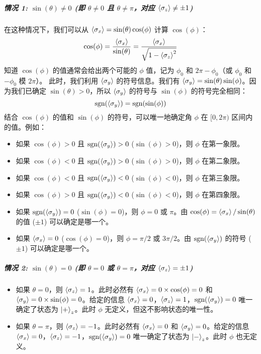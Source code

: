 \documentclass[12pt, a4paper]{article}
\begin{document}
\subparagraph{情况 1: \(\sin(\theta) \neq 0\) (即 \(\theta \neq 0\) 且 \(\theta \neq \pi\)，对应 \(\expval{\sigma_z} \neq \pm 1\))}
在这种情况下，我们可以从 \(\expval{\sigma_x} = \sin(\theta) \cos(\phi)\) 计算 \(\cos(\phi)\)：
\[
\cos(\phi) = \frac{\expval{\sigma_x}}{\sin(\theta)} = \frac{\expval{\sigma_x}}{\sqrt{1 - \expval{\sigma_z}^2}}
\]
知道 \(\cos(\phi)\) 的值通常会给出两个可能的 \(\phi\) 值，记为 \(\phi_0\) 和 \(2\pi - \phi_0\)（或 \(\phi_0\) 和 \(-\phi_0\) 模 \(2\pi\)）。
此时，我们利用 \(\expval{\sigma_y}\) 的符号信息。我们有 \(\expval{\sigma_y} = \sin(\theta) \sin(\phi)\)。因为我们已确定 \(\sin(\theta) > 0\)，所以 \(\expval{\sigma_y}\) 的符号与 \(\sin(\phi)\) 的符号完全相同：
\[
\text{sgn}(\expval{\sigma_y}) = \text{sgn}(\sin(\phi))
\]
结合 \(\cos(\phi)\) 的值和 \(\sin(\phi)\) 的符号，可以唯一地确定角 \(\phi\) 在 \([0, 2\pi)\) 区间内的值。例如：
\begin{itemize}
    \item 如果 \(\cos(\phi) > 0\) 且 \(\text{sgn}(\expval{\sigma_y}) > 0\) (\(\sin(\phi) > 0\))，则 \(\phi\) 在第一象限。
    \item 如果 \(\cos(\phi) < 0\) 且 \(\text{sgn}(\expval{\sigma_y}) > 0\) (\(\sin(\phi) > 0\))，则 \(\phi\) 在第二象限。
    \item 如果 \(\cos(\phi) < 0\) 且 \(\text{sgn}(\expval{\sigma_y}) < 0\) (\(\sin(\phi) < 0\))，则 \(\phi\) 在第三象限。
    \item 如果 \(\cos(\phi) > 0\) 且 \(\text{sgn}(\expval{\sigma_y}) < 0\) (\(\sin(\phi) < 0\))，则 \(\phi\) 在第四象限。
    \item 如果 \(\text{sgn}(\expval{\sigma_y}) = 0\) (\(\sin(\phi) = 0\))，则 \(\phi = 0\) 或 \(\pi\)。由 \(\cos(\phi) = \expval{\sigma_x}/\sin(\theta)\) 的值 (\(\pm 1\)) 可以确定是哪一个。
    \item 如果 \(\expval{\sigma_x} = 0\) (\(\cos(\phi) = 0\))，则 \(\phi = \pi/2\) 或 \(3\pi/2\)。由 \(\text{sgn}(\expval{\sigma_y})\) 的符号 (\(\pm 1\)) 可以确定是哪一个。
\end{itemize}

\subparagraph{情况 2: \(\sin(\theta) = 0\) (即 \(\theta = 0\) 或 \(\theta = \pi\)，对应 \(\expval{\sigma_z} = \pm 1\))}
\begin{itemize}
    \item 如果 \(\theta = 0\)，则 \(\expval{\sigma_z} = 1\)。此时必然有 \(\expval{\sigma_x} = 0 \times \cos(\phi) = 0\) 和 \(\expval{\sigma_y} = 0 \times \sin(\phi) = 0\)。给定的信息 \(\expval{\sigma_x} = 0\)，\(\expval{\sigma_z} = 1\)，\(\text{sgn}(\expval{\sigma_y}) = 0\) 唯一确定了状态为 \(\ket{+}_z\)。此时 \(\phi\) 无定义，但这不影响状态的唯一性。
    \item 如果 \(\theta = \pi\)，则 \(\expval{\sigma_z} = -1\)。此时必然有 \(\expval{\sigma_x} = 0\) 和 \(\expval{\sigma_y} = 0\)。给定的信息 \(\expval{\sigma_x} = 0\)，\(\expval{\sigma_z} = -1\)，\(\text{sgn}(\expval{\sigma_y}) = 0\) 唯一确定了状态为 \(\ket{-}_z\)。此时 \(\phi\) 也无定义。
\end{itemize}
\end{document}
